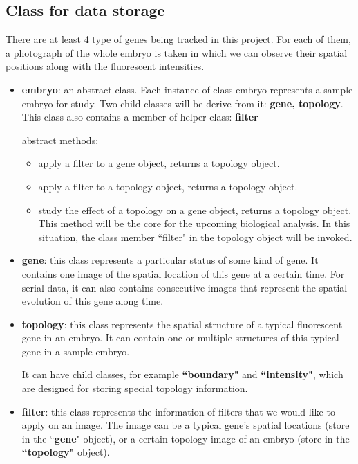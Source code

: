 \documentclass[a4paper,12pt]{article}
\theoremstyle{remark}
\numberwithin{equation}{section}
\begin{document}
	\subsection{Class for data storage}
	There are at least 4 type of genes being tracked in this project. For each of them, a photograph of the whole embryo is taken in which we can observe their spatial positions along with the fluorescent intensities.
	
	\begin{itemize}
		\item \textbf{embryo}: an abstract class. Each instance of class embryo represents a sample embryo for study. Two child classes will be derive from it: \textbf{gene, topology}. This class also contains a member of helper class: \textbf{filter}
		
		abstract methods:
		\begin{itemize}
			\item apply a filter to a gene object, returns a topology object.
			\item apply a filter to a topology object, returns a topology object.
			\item study the effect of a topology on a gene object, returns a topology object. This method will be the core for the upcoming biological analysis.  In this situation, the class member ``filter" in the topology object will be invoked.
		\end{itemize} 
		 
	
		\item \textbf{gene}: this class represents a particular status of some kind of gene. It contains one image of the spatial location of this gene at a certain time. 
		For serial data, it can also contains consecutive images that represent the spatial evolution of this gene along time.
		
		\item \textbf{topology}: this class represents the spatial structure of a typical fluorescent gene in an embryo. It can contain one or multiple structures of this typical gene in a sample embryo.
		
		It can have child classes, for example \textbf{``boundary"} and \textbf{``intensity"}, which are designed for storing special topology information.
		
		\item \textbf{filter}: this class represents the information of filters that we would like to apply on an image. The image can be a typical gene's spatial locations (store in the ``\textbf{gene}" object), or a certain topology image of an embryo (store in the \textbf{``topology"} object).		
		
	\end{itemize} 
\end{document}
